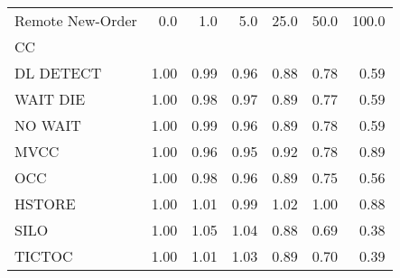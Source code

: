 \begin{tabular}{lrrrrrr}
\toprule
Remote New-Order &  0.0   &  1.0   &  5.0   &  25.0  &  50.0  &  100.0 \\
CC        &        &        &        &        &        &        \\
\midrule
DL DETECT &   1.00 &   0.99 &   0.96 &   0.88 &   0.78 &   0.59 \\
WAIT DIE  &   1.00 &   0.98 &   0.97 &   0.89 &   0.77 &   0.59 \\
NO WAIT   &   1.00 &   0.99 &   0.96 &   0.89 &   0.78 &   0.59 \\
MVCC      &   1.00 &   0.96 &   0.95 &   0.92 &   0.78 &   0.89 \\
OCC       &   1.00 &   0.98 &   0.96 &   0.89 &   0.75 &   0.56 \\
HSTORE    &   1.00 &   1.01 &   0.99 &   1.02 &   1.00 &   0.88 \\
SILO      &   1.00 &   1.05 &   1.04 &   0.88 &   0.69 &   0.38 \\
TICTOC    &   1.00 &   1.01 &   1.03 &   0.89 &   0.70 &   0.39 \\
\bottomrule
\end{tabular}
